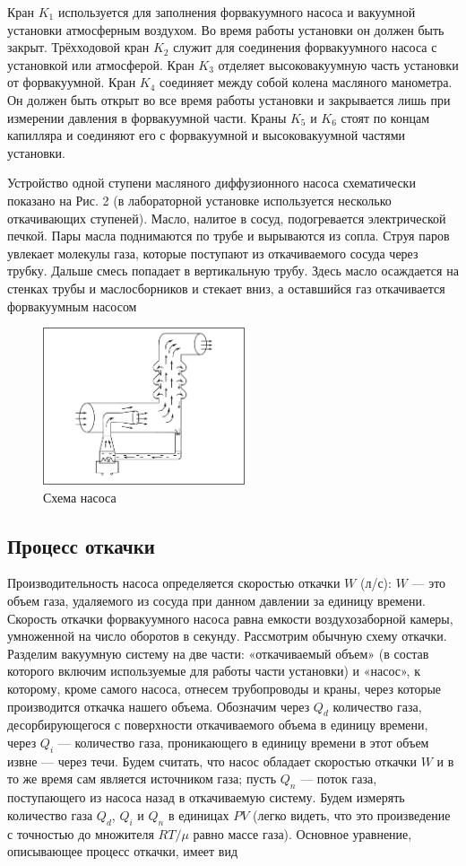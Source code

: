 \documentclass[a4paper]{article}
\begin{document}
Кран $K_1$ используется для заполнения форвакуумного насоса и вакуумной
установки атмосферным воздухом. Во время работы установки он
должен быть закрыт. Трёхходовой кран $K_2$ служит для соединения форвакуумного
насоса с установкой или атмосферой. Кран $K_3$ отделяет высоковакуумную
часть установки от форвакуумной. Кран $K_4$ соединяет между
собой колена масляного манометра. Он должен быть открыт во все время
работы установки и закрывается лишь при измерении давления в форвакуумной
части. Краны $K_5$ и $K_6$ стоят по концам капилляра и соединяют
его с форвакуумной и высоковакуумной частями установки.

Устройство одной ступени масляного
диффузионного насоса схематически показано на Рис. 2
(в лабораторной установке
используется несколько откачивающих
ступеней). Масло, налитое в сосуд, подогревается электрической печкой.
Пары масла поднимаются по трубе и вырываются
из сопла. Струя паров увлекает молекулы
газа, которые поступают из откачиваемого
сосуда через трубку. Дальше смесь попадает
в вертикальную трубу. Здесь масло осаждается
на стенках трубы и маслосборников
и стекает вниз, а оставшийся газ откачивается форвакуумным насосом

\begin{figure}[h]
    \centering
    \includegraphics[scale=0.7]{ust2.png}
    \caption{Схема насоса}
\end{figure}

\subsection{Процесс откачки}

Производительность насоса определяется скоростью откачки $W$ (л/с):
$W$ — это объем газа, удаляемого из сосуда при данном давлении за единицу времени.
Скорость откачки форвакуумного насоса равна емкости воздухозаборной камеры,
умноженной на число оборотов в секунду.
Рассмотрим обычную схему откачки.
Разделим вакуумную систему на две части: «откачиваемый объем»
(в состав которого включим используемые для работы части установки)
и «насос», к которому, кроме самого насоса, отнесем трубопроводы и краны,
через которые производится откачка нашего объема.
Обозначим через $Q_d$ количество газа,
десорбирующегося с поверхности откачиваемого объема в единицу времени,
через $Q_i$ — количество газа, проникающего в единицу времени в этот объем извне
— через течи.
Будем считать, что насос обладает скоростью откачки $W$
и в то же время сам является источником газа; пусть $Q_n$ — поток газа,
поступающего из насоса назад в откачиваемую систему.
Будем измерять количество газа $Q_d$, $Q_i$ и $Q_n$ в единицах $PV$
(легко видеть, что это произведение с точностью до множителя $RT/ \mu$ равно массе газа).
Основное уравнение, описывающее процесс откачки, имеет вид
\end{document}
